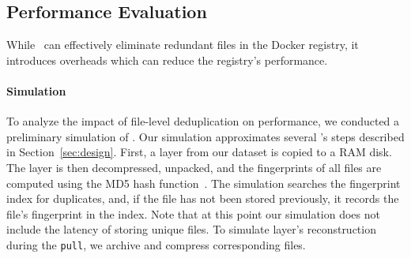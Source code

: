 \subsection{Performance Evaluation}

While \sysname\ can effectively eliminate redundant files in the
Docker registry, it introduces overheads which can reduce the
registry's performance.
%



\paragraph{Simulation}
%
To analyze the impact of file-level deduplication on performance,
we conducted a preliminary simulation of \sysname.
%
%
%
%
%
Our simulation
approximates several \sysname's steps described in Section~\ref{sec:design}.
%
First, a layer from our dataset is copied to a RAM disk. 
%
%
%
The layer is then decompressed, unpacked, and the fingerprints of all files
are computed using the MD5 hash function~\cite{MD5}.
%
The simulation searches the fingerprint index for duplicates,
and, if the file has not been stored previously, it records the
file's fingerprint in the index.
%
%
%
%
%
Note that at this point our simulation does not include
the latency of storing unique files.
%
To simulate layer's reconstruction during the \texttt{pull},
we archive and compress corresponding files.
%
%

